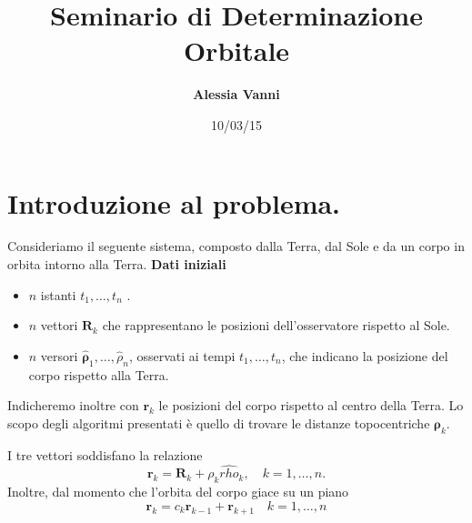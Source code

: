 \documentclass{beamer}
\begin{document}
\title[]{\bf Seminario di Determinazione Orbitale}

\author[Alessia Vanni]{\textcolor{MyDarkBlue}{\bf \large Alessia Vanni} }
    

\date{10/03/15}

\small
\begin{frame}[plain]
\titlepage
\end{frame}
\begin{frame}[plain]
\tableofcontents
\end{frame}
\section{Introduzione al problema.}
\begin{frame}
Consideriamo il seguente sistema, composto dalla Terra, dal Sole e da un corpo in orbita intorno alla Terra. 
\vskip 0.5cm
\textbf{Dati iniziali}
\begin{itemize}
\item $n$ istanti $t_1, \dots, t_n$ .
\item $n$ vettori $\textbf{R}_k$ che rappresentano le posizioni dell'osservatore rispetto al Sole.
\item $n$ versori $ \hat{\mathbf{\rho}}_1, \dots, \hat{ \rho }_n$, osservati ai tempi $t_1, \dots, t_n$, che indicano la posizione del corpo rispetto alla Terra.
\end{itemize}


\vskip 0.5cm
Indicheremo inoltre con $\textbf{r}_k$ le posizioni del corpo rispetto al centro della Terra.
Lo scopo degli algoritmi presentati \`e quello di trovare le distanze topocentriche $\mathbf \rho_k$. 



\end{frame}
\begin{frame}[plain]
I tre vettori soddisfano la relazione
 \begin{equation}
\textbf{r}_k=\textbf{R}_k+ \rho_k \hat{rho}_k, \quad k=1,\dots, n.
\end{equation}
Inoltre, dal momento che l'orbita del corpo giace su un piano \begin{equation}
\textbf{r}_k=c_k \textbf{r}_{k-1} + \textbf{r}_{k+1} \quad k=1,\dots, n
\end{equation}

\end{frame}
\end{document}
